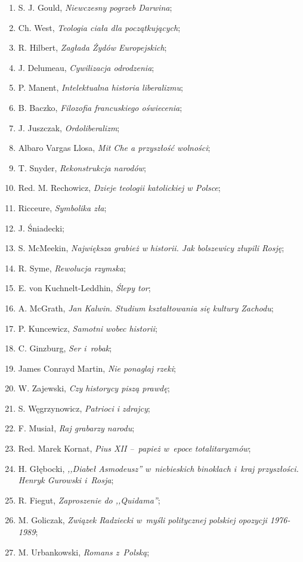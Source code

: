 \documentclass[a4paper,11pt]{article}
\begin{document}
\begin{enumerate}
\item S. J. Gould, \emph{Niewczesny pogrzeb Darwina};
\item Ch. West, \emph{Teologia ciała dla początkujących};
\item R. Hilbert, \emph{Zagłada Żydów Europejskich};
\item J. Delumeau, \emph{Cywilizacja odrodzenia};
\item P. Manent, \emph{Intelektualna historia liberalizmu};
\item B. Baczko, \emph{Filozofia francuskiego oświecenia};
\item J. Juszczak, \emph{Ordoliberalizm};
\item Albaro Vargas Llosa, \emph{Mit Che a przyszłość wolności};
\item T. Snyder, \emph{Rekonstrukcja narodów};
\item Red. M. Rechowicz, \emph{Dzieje teologii katolickiej w Polsce};
\item Ricceure, \emph{Symbolika zła};
\item J. Śniadecki;
\item S. McMeekin, \emph{Największa grabież w historii. Jak bolszewicy
    złupili Rosję};
\item R. Syme, \emph{Rewolucja rzymska};
\item E. von Kuchnelt-Leddhin, \emph{Ślepy tor};
\item A. McGrath, \emph{Jan Kalwin. Studium kształtowania się kultury
    Zachodu};
\item P. Kuncewicz, \emph{Samotni wobec historii};
\item C. Ginzburg, \emph{Ser i~robak};
\item James Conrayd Martin, \emph{Nie ponaglaj rzeki};
\item W. Zajewski, \emph{Czy historycy piszą prawdę};
\item S. Węgrzynowicz, \emph{Patrioci i zdrajcy};
\item F. Musiał, \emph{Raj grabarzy narodu};
\item Red. Marek Kornat, \emph{Pius XII --~papież w~epoce
    totalitaryzmów};
\item H. Głębocki, \emph{,,Diabeł Asmodeusz'' w~niebieskich binoklach
    i~kraj przyszłości. Henryk Gurowski i~Rosja};
\item R. Fiegut, \emph{Zaproszenie do ,,Quidama''};
\item M. Goliczak, \emph{Związek Radziecki w~myśli politycznej
    polskiej opozycji 1976-1989};
\item M. Urbankowski, \emph{Romans z~Polską};

\end{enumerate}
\end{document}
